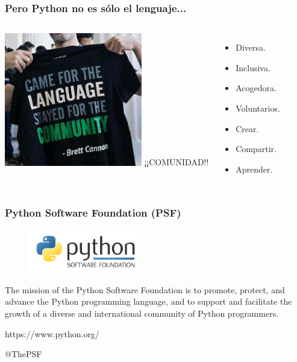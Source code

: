 \documentclass[18pt]{beamer}
\begin{document}
\begin{frame}

	\frametitle{Pero Python no es sólo el lenguaje...}
	   
	\begin{columns}
		\centering
			\includegraphics[width=6cm]{images/tshirt_quote.jpg}
		\large ¡¡COMUNIDAD!!
		\vspace{0.4cm}
		\begin{itemize}
			\setlength\itemsep{0.6em}		
			\item Diversa.
			\item Inclusiva.
			\item Acogedora.
			\vspace{0.4cm}
			\item Voluntarios.
			\item Crear.
			\item Compartir.
			\item Aprender.  
		\end{itemize}
	\end{columns}
	
\end{frame}


\begin{frame}

	\frametitle{Python Software Foundation (PSF)}
	
	\begin{figure}
		\includegraphics[width=5cm]{images/psf.png}
	\end{figure}
	
	The mission of the Python Software Foundation is to promote, protect, 
	and advance the Python programming language, and to support and 
	facilitate the growth of a diverse and international 
	community of Python programmers.


	\vspace{0.6cm}    
	\centerline{https://www.python.org/}
	
	\vspace{0.4cm}
	\centerline{@ThePSF}
	
\end{frame}
\end{document}
